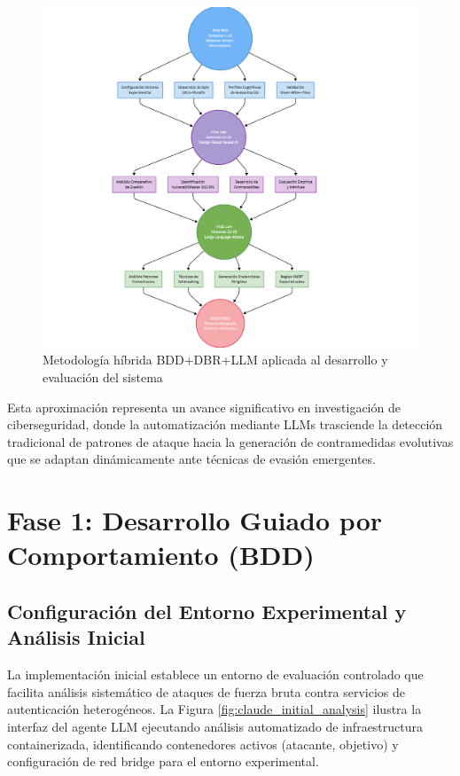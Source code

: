 \begin{figure}[!htbp]
\centering
\includegraphics[width=1\textwidth]{figures/metodologia_hibrida_bdd_dbr.png}
\caption{Metodología híbrida BDD+DBR+LLM aplicada al desarrollo y evaluación del sistema}
\label{fig:metodologia_hibrida}
\end{figure}

Esta aproximación representa un avance significativo en investigación de ciberseguridad, donde la automatización mediante LLMs trasciende la detección tradicional de patrones de ataque hacia la generación de contramedidas evolutivas que se adaptan dinámicamente ante técnicas de evasión emergentes.

\section{Fase 1: Desarrollo Guiado por Comportamiento (BDD)}
\FloatBarrier

\subsection{Configuración del Entorno Experimental y Análisis Inicial}
\FloatBarrier

La implementación inicial establece un entorno de evaluación controlado que facilita análisis sistemático de ataques de fuerza bruta contra servicios de autenticación heterogéneos. La Figura \ref{fig:claude_initial_analysis} ilustra la interfaz del agente LLM ejecutando análisis automatizado de infraestructura containerizada, identificando contenedores activos (atacante, objetivo) y configuración de red bridge para el entorno experimental.

